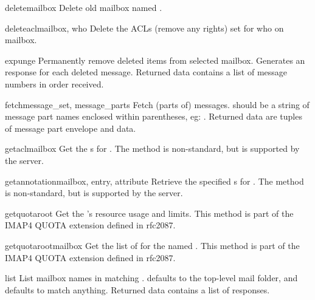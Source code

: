 \begin{methoddesc}{delete}{mailbox}
  Delete old mailbox named .
\end{methoddesc}

\begin{methoddesc}{deleteacl}{mailbox, who}
  Delete the ACLs (remove any rights) set for who on mailbox.
\end{methoddesc}

\begin{methoddesc}{expunge}{}
  Permanently remove deleted items from selected mailbox. Generates an
   response for each deleted message. Returned data
  contains a list of  message numbers in order
  received.
\end{methoddesc}

\begin{methoddesc}{fetch}{message_set, message_parts}
  Fetch (parts of) messages.   should be
  a string of message part names enclosed within parentheses,
  eg: .  Returned data are tuples
  of message part envelope and data.
\end{methoddesc}

\begin{methoddesc}{getacl}{mailbox}
  Get the s for .
  The method is non-standard, but is supported by the  server.
\end{methoddesc}

\begin{methoddesc}{getannotation}{mailbox, entry, attribute}
  Retrieve the specified s for .
  The method is non-standard, but is supported by the  server.
\end{methoddesc}

\begin{methoddesc}{getquota}{root}
  Get the  's resource usage and limits.
  This method is part of the IMAP4 QUOTA extension defined in rfc2087.
\end{methoddesc}

\begin{methoddesc}{getquotaroot}{mailbox}
  Get the list of   for the named .
  This method is part of the IMAP4 QUOTA extension defined in rfc2087.
\end{methoddesc}

\begin{methoddesc}{list}{}
  List mailbox names in  matching
  .   defaults to the top-level mail
  folder, and  defaults to match anything.  Returned data
  contains a list of  responses.
\end{methoddesc}

